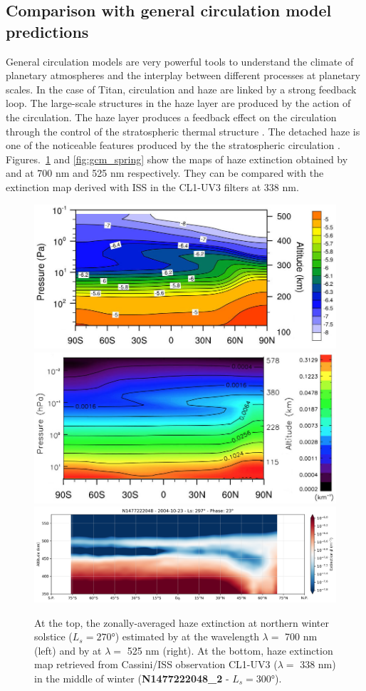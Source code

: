 \subsection{Comparison with general circulation model predictions}

General circulation models are very powerful tools to understand the climate of planetary atmospheres and the
interplay between different processes at planetary scales. In the case of Titan, circulation and haze are linked
by a strong feedback loop. The large-scale structures in the haze layer are produced by the action of the
circulation. The haze layer produces a feedback effect on the circulation through the control of the stratospheric
thermal structure \citep{Rannou2004}. The detached haze is one of the noticeable features produced by the the
stratospheric circulation \citep{Rannou2002, Lebonnois2012, Larson2015}. Figures.~\ref{fig:gcm_winter}
and \ref{fig:gcm_spring} show the maps of haze extinction obtained by \cite{Lebonnois2012} and
\cite{Larson2015} at 700 nm and 525 nm respectively. They can be compared with the extinction map derived
with ISS in the CL1-UV3 filters at 338 nm.

\begin{figure}[!ht]
    \centering
    \includegraphics[width=.4\textwidth]{Fig/Lebonnois2012_Fig4_winter.jpg}
    \includegraphics[width=.4\textwidth]{Fig/Larson2015-Fig7_Winter.jpg}
    \includegraphics[width=.8\textwidth]{Fig/N1477222048_2-lat_beta.png}
    \caption{At the top, the zonally-averaged haze extinction at northern winter solstice
        ($L_s = \ang{270}$) estimated by \cite{Lebonnois2012} at the wavelength $\lambda = $ 700 nm (left)
        and by \cite{Larson2015} at $\lambda = $ 525 nm (right). At the bottom, haze extinction map
        retrieved from Cassini/ISS observation CL1-UV3 ($\lambda = $ 338 nm) in the middle of winter
        (\textbf{N1477222048\_2} - $L_s = \ang{300}$).}
    \label{fig:gcm_winter}
\end{figure}

